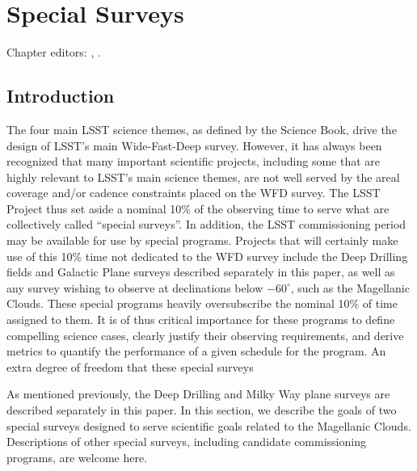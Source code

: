 \chapter[Special Surveys]{Special Surveys}
\def\chpname{specialsurveys}\label{chp:\chpname}

Chapter editors: 
,
.




\section{Introduction}
\label{sec:specials:intro}


The four main LSST science themes, as defined by the Science Book, drive the design of LSST's main Wide-Fast-Deep survey.  However, it has always been recognized that many important scientific projects, including some that are highly relevant to LSST's main science themes, are not well served by the areal coverage and/or cadence constraints placed on the WFD survey.  The LSST Project thus set aside a nominal 10\% of the observing time to serve what are collectively called ``special surveys''.  In addition, the LSST commissioning period may be available for use by special programs.  Projects that will certainly make use of this 10\% time not dedicated to the WFD survey include the Deep Drilling fields and Galactic Plane surveys described separately in this paper, as well as any survey wishing to observe at declinations below $-60^\circ$, such as the Magellanic Clouds.  These special programs heavily oversubscribe the nominal 10\% of time assigned to them.  It is of thus critical importance for these programs to define compelling science cases, clearly justify their observing requirements, and derive metrics to quantify the performance of a given schedule for the program.  An extra degree of freedom that these special surveys


As mentioned previously, the Deep Drilling and Milky Way plane surveys are described separately in this paper.  In this section, we describe the goals of two special surveys designed to serve scientific goals related to the Magellanic Clouds.  Descriptions of other special surveys, including candidate commissioning programs, are welcome here.


